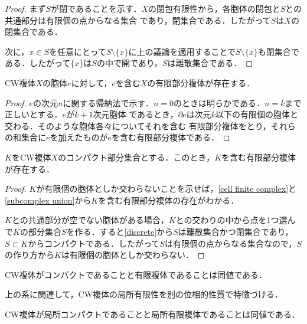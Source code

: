 \documentclass[uplatex]{jsarticle}
\begin{document}
\begin{proof}
  まず$S$が閉であることを示す．$X$の閉包有限性から，各胞体の閉包と$S$との共通部分は有限個の点からなる集合
  であり，閉集合である．したがって$S$は$X$の閉集合である．

  次に，$x\in S$を任意にとって$S\setminus \{x\}$に上の議論を適用することで$S\setminus \{x\}$も閉集合で
  ある．したがって$\{x\}$は$S$の中で開であり，$S$は離散集合である．
\end{proof}

\begin{lemma}\label{cell finite complex}
  CW複体$X$の胞体$e$に対して，$e$を含む$X$の有限部分複体が存在する．
\end{lemma}

\begin{proof}
  $e$の次元$n$に関する帰納法で示す．$n=0$のときは明らかである．$n=k$まで正しいとする．$e$が$k+1$次元胞体
  であるとき，$\partial e$は次元$k$以下の有限個の胞体と交わる．そのような胞体各々についてそれを含む
  有限部分複体をとり，それらの和集合に$e$を加えたものが$e$を含む有限部分複体である．
\end{proof}

\begin{theorem}\label{compact finite subcomplex}
  $K$をCW複体$X$のコンパクト部分集合とする．このとき，$K$を含む有限部分複体が存在する．
\end{theorem}

\begin{proof}
  $K$が有限個の胞体としか交わらないことを示せば，\cref{cell finite complex}と\cref{subcomplex union}から$K$を含む有限部分複体の存在がわかる．

  $K$との共通部分が空でない胞体がある場合，$K$との交わりの中から点を1つ選んで$K$の部分集合$S$を作る．すると\cref{discrete}から$S$は離散集合かつ閉集合であり，$S\subset K$からコンパクトである．したがって$S$は有限個の点からなる集合なので，$S$の作り方から$K$は有限個の胞体としか交わらない．
\end{proof}

\begin{corollary}
  CW複体がコンパクトであることと有限複体であることは同値である．
\end{corollary}

上の系に関連して，CW複体の局所有限性を別の位相的性質で特徴づける．

\begin{proposition}\label{locally compact locally finite}
  CW複体が局所コンパクトであることと局所有限複体であることは同値である．
\end{proposition}
\end{document}
